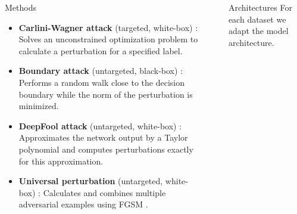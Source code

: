 \documentclass[final]{beamer}
\newlength{\sepwid}
\newlength{\onecolwid}
\newlength{\twocolwid}
\begin{document}
\begin{frame}[t]
\begin{columns}[t]
\begin{column}{\onecolwid}
			\begin{block}{Methods}
				\begin{itemize}
					\item \textbf{Carlini-Wagner attack} (targeted, white-box) \cite{carlini}: Solves an unconstrained optimization problem to calculate a perturbation for a specified label.
					\item \textbf{Boundary attack} (untargeted, black-box) \cite{boundary}: Performs a random walk close to the
					decision boundary while the norm of the perturbation is minimized.
					\item \textbf{DeepFool attack} (untargeted, white-box) \cite{deepfool}: Approximates the network output by a Taylor polynomial and computes perturbations exactly for this approximation.
					\item \textbf{Universal perturbation} (untargeted, white-box) \cite{universal}: Calculates and combines multiple adversarial examples using FGSM \cite{fgsm}.
				\end{itemize}
			\end{block}
			
			
			
		\end{column} %
		
		\begin{column}{\sepwid}\end{column} %
		
		\begin{column}{\twocolwid} %
			
			\begin{columns}[t,totalwidth=\twocolwid] %
				
				\begin{column}{\onecolwid}\vspace{-.6in} %
					
					
					\begin{block}{Architectures}
						For each dataset we adapt the model architecture.
						\vspace{1cm}
						

\end{block}
\end{column}
\end{columns}
\end{column}
\end{columns}
\end{frame}
\end{document}
